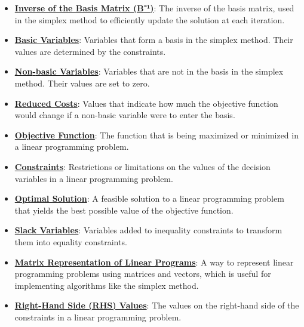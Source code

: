 \documentclass{article}%
\begin{document}
\begin{itemize}[leftmargin=*]
\item \href{https://www.math.purdue.edu/~yipn/421/2024-10-03-DualSimplexMatrix.pdf#page=7}{\textbf{Inverse of the Basis Matrix (B⁻¹)}}: The inverse of the basis matrix, used in the simplex method to efficiently update the solution at each iteration. %
\item \href{https://www.math.purdue.edu/~yipn/421/2024-10-03-DualSimplexMatrix.pdf#page=2}{\textbf{Basic Variables}}: Variables that form a basis in the simplex method. Their values are determined by the constraints. %
\item \href{https://www.math.purdue.edu/~yipn/421/2024-10-03-DualSimplexMatrix.pdf#page=2}{\textbf{Non{-}basic Variables}}: Variables that are not in the basis in the simplex method. Their values are set to zero. %
\item \href{https://www.math.purdue.edu/~yipn/421/2024-10-03-DualSimplexMatrix.pdf#page=7}{\textbf{Reduced Costs}}: Values that indicate how much the objective function would change if a non-basic variable were to enter the basis. %
\item \href{https://www.math.purdue.edu/~yipn/421/2024-10-03-DualSimplexMatrix.pdf#page=1}{\textbf{Objective Function}}: The function that is being maximized or minimized in a linear programming problem. %
\item \href{https://www.math.purdue.edu/~yipn/421/2024-10-03-DualSimplexMatrix.pdf#page=1}{\textbf{Constraints}}: Restrictions or limitations on the values of the decision variables in a linear programming problem. %
\item \href{https://www.math.purdue.edu/~yipn/421/2024-10-03-DualSimplexMatrix.pdf#page=2}{\textbf{Optimal Solution}}: A feasible solution to a linear programming problem that yields the best possible value of the objective function. %
\item \href{https://www.math.purdue.edu/~yipn/421/2024-10-03-DualSimplexMatrix.pdf#page=2}{\textbf{Slack Variables}}: Variables added to inequality constraints to transform them into equality constraints. %
\item \href{https://www.math.purdue.edu/~yipn/421/2024-10-03-DualSimplexMatrix.pdf#page=7}{\textbf{Matrix Representation of Linear Programs}}: A way to represent linear programming problems using matrices and vectors, which is useful for implementing algorithms like the simplex method. %
\item \href{https://www.math.purdue.edu/~yipn/421/2024-10-03-DualSimplexMatrix.pdf#page=8}{\textbf{Right{-}Hand Side (RHS) Values}}: The values on the right-hand side of the constraints in a linear programming problem. %

\end{itemize}
\end{document}
